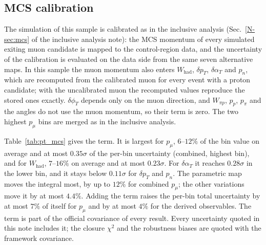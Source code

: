 \documentclass[11pt,a4paper]{article}
\newcommand{\noteref}[2]{#1~\ref{N-#2} of the inclusive analysis note}
\begin{document}
\subsection{MCS calibration}
\label{sec:pt_mcs}

The simulation of this sample is calibrated as in the inclusive analysis (\noteref{Sec.}{sec:mcs}): the MCS momentum
of every simulated exiting muon candidate is mapped to the control-region data, and the uncertainty of the
calibration is evaluated on the data side from the same seven alternative maps. In this sample the muon momentum also
enters $W_\mathrm{had}$, $\delta p_T$, $\delta\alpha_T$ and $p_n$, which are recomputed from the calibrated muon for
every event with a proton candidate; with the uncalibrated muon the recomputed values reproduce the stored ones
exactly. $\delta\phi_T$ depends only on the muon direction, and $W_{\pi p}$, $p_p$, $p_\pi$ and the angles do not use
the muon momentum, so their term is zero. The two highest $p_\mu$ bins are merged as in the inclusive analysis.

Table~\ref{tab:pt_mcs} gives the term. It is largest for $p_\mu$, $6$--$12\%$ of the bin value on average and at
most $0.35\sigma$ of the per-bin uncertainty (combined, highest bin), and for $W_\mathrm{had}$, $7$--$16\%$ on average
and at most $0.23\sigma$. For $\delta\alpha_T$ it reaches $0.28\sigma$ in the lower bin, and it stays below $0.11\sigma$
for $\delta p_T$ and $p_n$. The parametric map moves the integral most, by up to $12\%$ for combined $p_\mu$; the other
variations move it by at most $4.4\%$. Adding the term raises the per-bin total uncertainty by at most $7\%$ of itself
for $p_\mu$ and by at most $4\%$ for the derived observables. The term is part of the official covariance of every
result. Every uncertainty quoted in this note includes it; the closure $\chi^2$ and the robustness biases are quoted
with the framework covariance.
\end{document}
